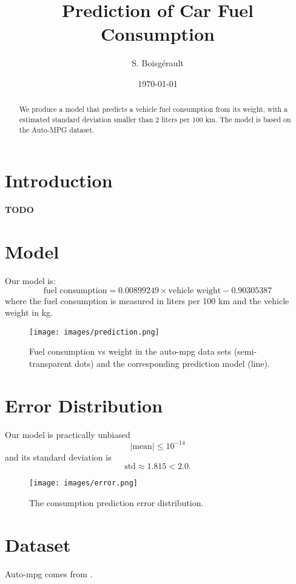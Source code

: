\documentclass{article}
\title{Prediction of Car Fuel Consumption}
\author{S. Boisgérault}
\date{\today}
\begin{document}
\maketitle

\begin{abstract}
We produce a model that predicts a vehicle fuel consumption from its weight, 
with a estimated standard deviation smaller than 2 liters per 100 km. 
The model is based on the Auto-MPG dataset.  
\end{abstract}

\section{Introduction}
\textbf{TODO}

\section{Model}

Our model is:
$$
\mbox{fuel consumption} =  0.00899249 \times \mbox{vehicle weight} -0.90305387
$$
where the fuel consumption is measured in liters per 100 km and the vehicle 
weight in kg.


\begin{figure}[htbp]
    \centering
    \texttt{[image: images/prediction.png]} %
    \caption{Fuel consumption vs weight in the auto-mpg data sets (semi-transparent dots) 
     and the corresponding prediction model (line).}
    \label{fig:example}
\end{figure}


\section{Error Distribution}

Our model is practically unbiased 
$$
|\mbox{mean}| \leq 10^{-14}
$$
and its standard deviation is
$$
\mbox{std} \approx 1.815 < 2.0.
$$

\begin{figure}[htbp]
    \centering
    \texttt{[image: images/error.png]}
    \caption{The consumption prediction error distribution.}
\end{figure}

\section{Dataset}

Auto-mpg comes from \cite{auto_mpg_9}.

\printbibliography
\end{document}
